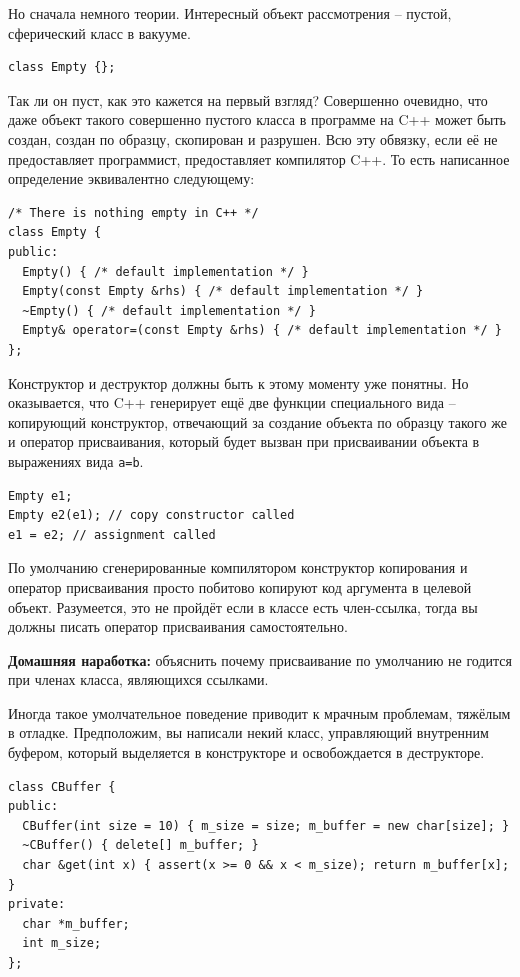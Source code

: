\documentclass[a4paper,12pt,oneside]{article}
\begin{document}
Но сначала немного теории. Интересный объект рассмотрения -- пустой, сферический класс в вакууме.

\begin{lstlisting}
class Empty {};
\end{lstlisting}

Так ли он пуст, как это кажется на первый взгляд? Совершенно очевидно, что даже объект такого совершенно пустого класса в программе на C++ может быть создан, создан по образцу, скопирован и разрушен. Всю эту обвязку, если её не предоставляет программист, предоставляет компилятор C++. То есть написанное определение эквивалентно следующему:

\begin{lstlisting}
/* There is nothing empty in C++ */
class Empty {
public:
  Empty() { /* default implementation */ }
  Empty(const Empty &rhs) { /* default implementation */ }
  ~Empty() { /* default implementation */ }
  Empty& operator=(const Empty &rhs) { /* default implementation */ }
};
\end{lstlisting}

Конструктор и деструктор должны быть к этому моменту уже понятны. Но оказывается, что C++ генерирует ещё две функции специального вида – копирующий конструктор, отвечающий за создание объекта по образцу такого же и оператор присваивания, который будет вызван при присваивании объекта в выражениях вида \lstinline!a=b!.

\begin{lstlisting}
Empty e1;
Empty e2(e1); // copy constructor called
e1 = e2; // assignment called 
\end{lstlisting}

По умолчанию сгенерированные компилятором конструктор копирования и оператор присваивания просто побитово копируют код аргумента в целевой объект. Разумеется, это не пройдёт если в классе есть член-ссылка, тогда вы должны писать оператор присваивания самостоятельно.

\textbf{Домашняя наработка:} объяснить почему присваивание по умолчанию не годится при членах класса, являющихся ссылками.

Иногда такое умолчательное поведение приводит к мрачным проблемам, тяжёлым в отладке. Предположим, вы написали некий класс, управляющий внутренним буфером, который выделяется в конструкторе и освобождается в деструкторе.

\begin{lstlisting}
class CBuffer {
public:
  CBuffer(int size = 10) { m_size = size; m_buffer = new char[size]; }
  ~CBuffer() { delete[] m_buffer; }
  char &get(int x) { assert(x >= 0 && x < m_size); return m_buffer[x]; } 
private:
  char *m_buffer;
  int m_size;
};
\end{lstlisting}
\end{document}
